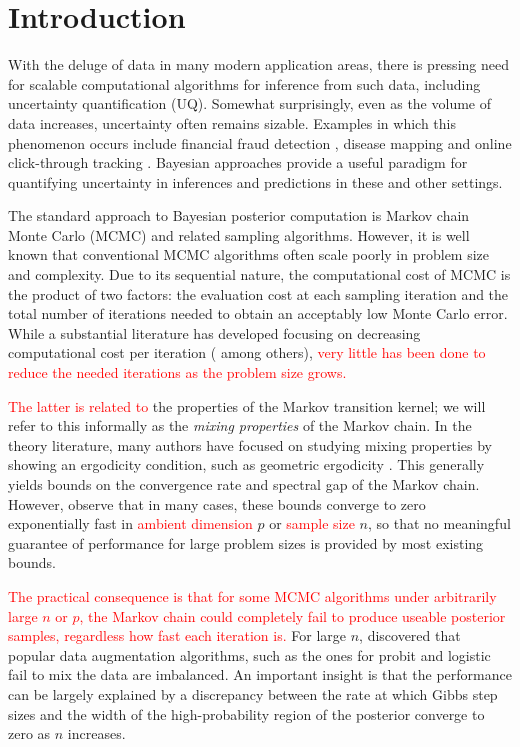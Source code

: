 \documentclass[11pt]{article}
\newcommand{\leo}[1]{{\textcolor{red}{#1}}}
\begin{document}

\section{Introduction}

With the deluge of data in many modern application areas, there is pressing need for scalable computational algorithms for inference from such data, including uncertainty quantification (UQ).  Somewhat surprisingly, even as the volume of data increases, uncertainty often remains sizable.  Examples in which this phenomenon occurs include financial fraud detection \citep{ngai2011application}, disease mapping \citep{wakefield2007disease} and online click-through tracking \citep{wang2010click}.  Bayesian approaches provide a useful paradigm for quantifying uncertainty in inferences and predictions in these and other settings.

The standard approach to Bayesian posterior computation is Markov chain Monte Carlo (MCMC) and related sampling algorithms. However, it is well known that conventional MCMC algorithms often scale poorly in problem size and complexity. Due to its sequential nature, the computational cost of MCMC is the product of two factors: the evaluation cost at each sampling iteration and the total number of iterations needed to obtain an acceptably low Monte Carlo error. While a substantial literature has developed focusing on decreasing computational cost per iteration (\cite{minsker2014robust,maclaurin2014firefly,
srivastava2015wasp,conrad2015accelerating} among others), \leo{very little has been done
to reduce the  needed iterations as the problem size grows.}

\leo{The latter  is related to} the properties of the Markov transition kernel; we will refer to this informally as the \emph{mixing properties} of the Markov chain. In the theory literature, many authors have focused on studying mixing properties by showing 
an ergodicity condition, such as geometric ergodicity \citep{roberts2004general,meyn2012markov}. This generally yields bounds on the convergence rate and spectral gap of the Markov chain. However, \cite{rajaratnam2015mcmc} observe that in many cases, these bounds converge to zero exponentially fast in \leo{ambient dimension} $p$ or \leo{sample size} $n$, so that no meaningful guarantee of performance for large problem sizes is provided by most existing bounds. 


\leo{The practical
consequence is that for some MCMC algorithms under arbitrarily large $n$ or $p$, the Markov chain could completely fail to produce useable posterior samples, regardless
how fast each iteration is.} For large $n$, \cite{johndrow2016inefficiency} discovered that popular data augmentation algorithms, such as the ones for probit \citep{albert1993bayesian} and logistic  \citep{polson2013bayesian}  fail to mix the data are imbalanced. An important insight is that the performance can be largely explained by a discrepancy between the rate at which Gibbs step sizes and the width of the high-probability region of the posterior converge to zero as $n$ increases.
\end{document}
